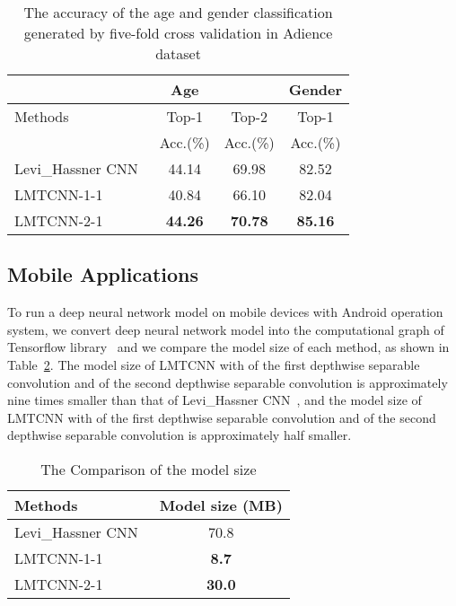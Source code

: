 \documentclass[times, 10pt,twocolumn]{article}
\begin{document}
\begin{table}[]
\centering
\caption{The accuracy of the age and gender classification generated by five-fold cross validation in Adience dataset }
\label{tab:agegenderaccuracy}
\begin{tabular}{@{}lccc@{}}
\toprule
& Age &  & Gender\\ \midrule
Methods  &  Top-1  &  Top-2 & Top-1  \\
 & Acc.(\%) & Acc.(\%) & Acc.(\%) \\ \midrule
Levi\_Hassner CNN~\cite{levi2015age} & 44.14 & 69.98 & 82.52 \\
LMTCNN-1-1 & 40.84 & 66.10 & 82.04 \\
LMTCNN-2-1 & \textbf{44.26} & \textbf{70.78} & \textbf{85.16} \\\bottomrule
\end{tabular}
\end{table}





\subsection{Mobile Applications}

To run a deep neural network model on mobile devices with Android operation system, we convert deep neural network model into the computational graph of Tensorflow library~\cite{abadi2016tensorflow} and we compare the model size of each method, as shown in Table~\ref{tab:modelsize}. The model size of LMTCNN with  of the first depthwise separable convolution and  of the second depthwise separable convolution is approximately nine times smaller than that of Levi\_Hassner CNN~\cite{levi2015age}, and the model size of LMTCNN with  of the first depthwise separable convolution and  of the second depthwise separable convolution is approximately half smaller.

\begin{table}[]
\centering
\caption{The Comparison of the model size}
\label{tab:modelsize}
\begin{tabular}{@{}lc@{}}
\toprule
Methods  & Model size (MB)   \\ \midrule
Levi\_Hassner CNN~\cite{levi2015age} & 70.8 \\
LMTCNN-1-1 &  \textbf{ 8.7 } \\
LMTCNN-2-1 & \textbf{ 30.0 } \\ \bottomrule
\end{tabular}
\end{table}
\end{document}
